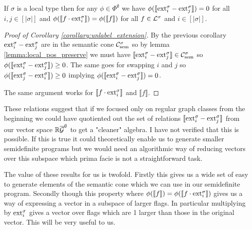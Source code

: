 \begin{corollary}
    \label{corollary:unlabel_extension}
    If $\sigma$ is a local type then for any $\phi\in\Phi^\emptyset$ we have
    $\phi(\llbracket \mathrm{ext}_i^\sigma - \mathrm{ext}_j^\sigma\rrbracket) = 0$
    for all $i,j\in [|\sigma|]$ and
    $\phi(\llbracket f \cdot \mathrm{ext}_i^\sigma\rrbracket) = \phi(\llbracket f \rrbracket)$
    for all $f\in\mathcal{L}^\sigma$ and $i\in [|\sigma|]$.
\end{corollary}

\begin{proof}[Proof of Corollary \ref{corollary:unlabel_extension}]
    By the previous corollary $\mathrm{ext}_i^\sigma - \mathrm{ext}_j^\sigma$ are in the
    semantic cone $\mathcal{C}_\mathrm{sem}^\sigma$ so by lemma \ref{lemma:local_pos_preserve}
    we must have $\llbracket \mathrm{ext}_i^\sigma - \mathrm{ext}_j^\sigma \rrbracket \in \mathcal{C}_\mathrm{sem}^\sigma$
    so $\phi(\llbracket \mathrm{ext}_i^\sigma - \mathrm{ext}_j^\sigma\rrbracket) \geq 0$.
    The same goes for swapping $i$ and $j$ so
    $\phi(\llbracket \mathrm{ext}_j^\sigma - \mathrm{ext}_i^\sigma\rrbracket) \geq 0$
    implying $\phi(\llbracket \mathrm{ext}_i^\sigma - \mathrm{ext}_j^\sigma\rrbracket) = 0$.

    The same argument works for $\llbracket f\cdot\mathrm{ext}_i^\sigma \rrbracket$ and
    $\llbracket f\rrbracket$.
\end{proof}

\begin{note}
    These relations suggest that if we focused only on regular graph classes
    from the beginning we could have quotiented out the set of relations
    $\llbracket \mathrm{ext}_i^\sigma - \mathrm{ext}_j^\sigma\rrbracket$ from our vector space $\mathbb{R}\overline{\mathcal{G}}^\emptyset$
    to get a "cleaner" algebra. I have not verified that this is possible. If this is true
    it could theoretically enable us to generate smaller semidefinite programs but we would
    need an algorithmic way of reducing vectors over this subspace which prima facie is not
    a straightforward task.
\end{note}

The value of these results for us is twofold. Firstly this gives us a wide set of
easy to generate elements of the semantic cone which we can use in our semidefinite
program. Secondly though this property where
$\phi(\llbracket f \rrbracket)=\phi(\llbracket f \cdot \mathrm{ext}_i^\sigma\rrbracket)$ gives
us a way of expressing a vector in a subspace of larger flags. In particular multiplying by
$\mathrm{ext}_i^\sigma$ gives a vector over flags which are 1 larger than those in the original
vector. This will be very useful to us.

